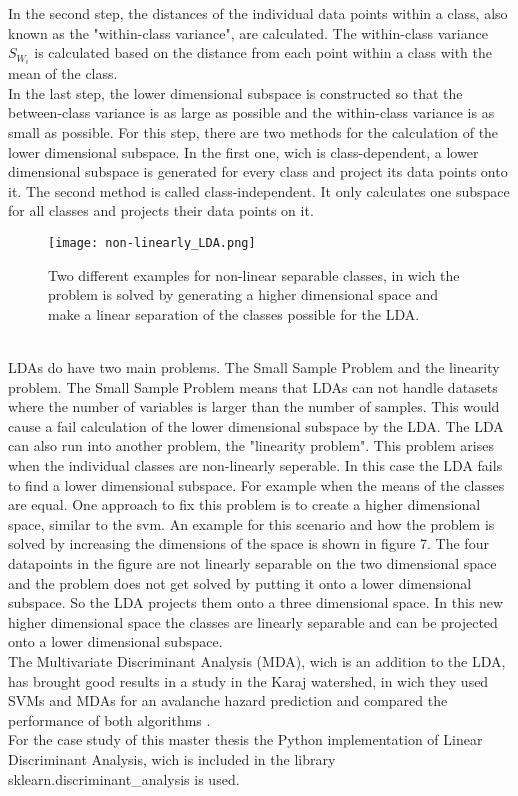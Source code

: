 \documentclass[../masterarbeit.tex]{subfiles}
\begin{document}
In the second step, the distances of the individual data points within a class, also known as the "within-class variance", are calculated. The within-class variance \(S_{W_i}\) is calculated based on the distance from each point within a class with the mean of the class. \autocite[]{Tharwat:2017} \\
In the last step, the lower dimensional subspace is constructed so that the between-class variance is as large as possible and the within-class variance is as small as possible. For this step, there are two methods for the calculation of the lower dimensional subspace. In the first one, wich is class-dependent, a lower dimensional subspace is generated for every class and project its data points onto it. The second method is called class-independent. It only calculates one subspace for all classes and projects their data points on it. \autocite[]{Tharwat:2017}
\begin{figure}[h]
    \centering
    \texttt{[image: non-linearly\_LDA.png]}
    \caption{Two different examples for non-linear separable classes, in wich the problem is solved by generating a higher dimensional space and make a linear separation of the classes possible for the LDA.}
\end{figure} \\
LDAs do have two main problems. The Small Sample Problem and the linearity problem.
The Small Sample Problem means that LDAs can not handle datasets where the number of variables is larger than the number of samples. This would cause a fail calculation of the lower dimensional subspace by the LDA. \autocite[]{MENDLEIN2013646} \autocite[]{analyticsvidhyaLDA:2021} \autocite[]{Tharwat:2017}
The LDA can also run into another problem, the "linearity problem". This problem arises when the individual classes are non-linearly seperable. In this case the LDA fails to find a lower dimensional subspace. For example when the means of the classes are equal. One approach to fix this problem is to create a higher dimensional space, similar to the svm. An example for this scenario and how the problem is solved by increasing the dimensions of the space is shown in figure 7. The four datapoints in the figure are not linearly separable on the two dimensional space and the problem does not get solved by putting it onto a lower dimensional subspace. So the LDA projects them onto a three dimensional space. In this new higher dimensional space the classes are linearly separable and can be projected onto a lower dimensional subspace. \autocite[]{Tharwat:2017} \\
The Multivariate Discriminant Analysis (MDA), wich is an addition to the LDA, has brought good results in a study in the Karaj watershed, in wich they used SVMs and MDAs for an avalanche hazard prediction and compared the performance of both algorithms \textcite[]{Bahram:2019}. \\
For the case study of this master thesis the Python implementation of Linear Discriminant Analysis, wich is included in the library sklearn.discriminant\_analysis is used. \autocite[]{Scikit-learn-lda:2022}
\end{document}
